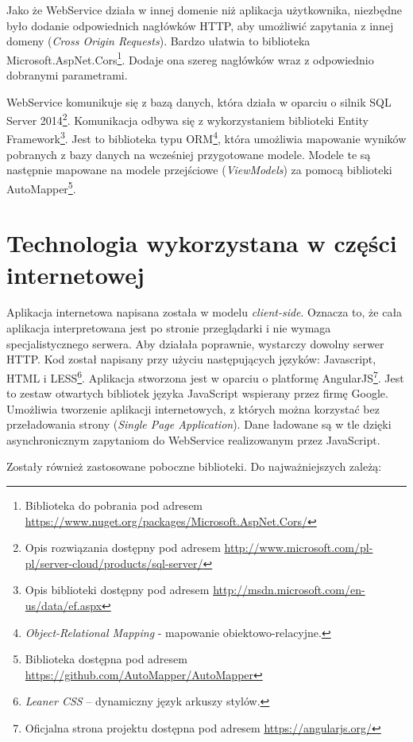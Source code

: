 \documentclass{book}
\begin{document}
		Jako że WebService działa w innej domenie niż aplikacja użytkownika, niezbędne było dodanie odpowiednich nagłówków HTTP, aby umożliwić zapytania z innej domeny (\emph{Cross Origin Requests}). Bardzo ułatwia to biblioteka Microsoft.AspNet.Cors\footnote{Biblioteka do pobrania pod adresem \url{https://www.nuget.org/packages/Microsoft.AspNet.Cors/}}. Dodaje ona szereg nagłówków wraz z odpowiednio dobranymi parametrami.
		
		WebService komunikuje się z bazą danych, która działa w oparciu o silnik SQL Server 2014\footnote{Opis rozwiązania dostępny pod adresem \url{http://www.microsoft.com/pl-pl/server-cloud/products/sql-server/}}. Komunikacja odbywa się z wykorzystaniem biblioteki Entity Framework\footnote{Opis biblioteki dostępny pod adresem \url{http://msdn.microsoft.com/en-us/data/ef.aspx}}. Jest to biblioteka typu ORM\footnote{\emph{Object-Relational Mapping} - mapowanie obiektowo-relacyjne. },
		która umożliwia mapowanie wyników pobranych z bazy danych na wcześniej przygotowane modele. Modele te są następnie mapowane na modele przejściowe (\emph{ViewModels}) za pomocą biblioteki AutoMapper\footnote{Biblioteka dostępna pod adresem \url{https://github.com/AutoMapper/AutoMapper}}.
		
		\section{Technologia wykorzystana w części internetowej} 
			
		Aplikacja internetowa napisana została w modelu \emph{client-side}. Oznacza to, że cała aplikacja interpretowana jest po stronie przeglądarki i nie wymaga specjalistycznego serwera. Aby działała poprawnie, wystarczy dowolny serwer HTTP. Kod został napisany przy użyciu następujących języków: Javascript, HTML i LESS\footnote{\emph{Leaner CSS} -- dynamiczny język arkuszy stylów.}. 
		Aplikacja stworzona jest w oparciu o platformę AngularJS\footnote{Oficjalna strona projektu dostępna pod adresem \url{https://angularjs.org/}}. Jest to zestaw otwartych bibliotek języka JavaScript wspierany przez firmę Google. Umożliwia tworzenie aplikacji internetowych, z których można korzystać bez przeładowania strony (\emph{Single Page Application}). Dane ładowane są w tle dzięki asynchronicznym zapytaniom do WebService realizowanym przez JavaScript.
		
		Zostały również zastosowane poboczne biblioteki. Do najważniejszych zależą:
		
\end{document}
